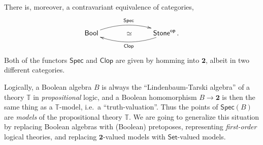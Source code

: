 \documentclass[graybox]{svmult}
\newcommand{\T}{\ensuremath{\mathbb{T}}}
\begin{document}
There is, moreover, a contravariant equivalence of categories,
\[
\xymatrix{ 
\mathsf{Bool}  \ar@/{}^{1pc}/[rr]^{\mathsf{Spec}}     & \quad\simeq &  \mathsf{Stone}^{\mathsf{op}}  \ar@/{}^{1pc}/[ll]^{\mathsf{Clop}} \,. \\
} 
\]
Both of the functors $\mathsf{Spec}$ and $\mathsf{Clop}$ are given by homming into $\mathbf{2}$, albeit in two different categories.

Logically, a Boolean algebra $B$  is always the ``Lindenbaum-Tarski algebra'' of a theory $\mathbb{T}$ in \emph{propositional} logic, and a Boolean homomorphism $B\to \mathbf{2}$ is then the same thing as a $\T$-model, i.e.\ a ``truth-valuation''.  Thus the points of $\mathsf{Spec}(B)$ are \emph{models} of the propositional theory $\mathbb{T}$.
We are going to generalize this situation by replacing Boolean algebras with (Boolean) pretoposes, representing \emph{first-order} logical theories, and replacing $\mathbf{2}$-valued models with $\mathsf{Set}$-valued models.
\end{document}
